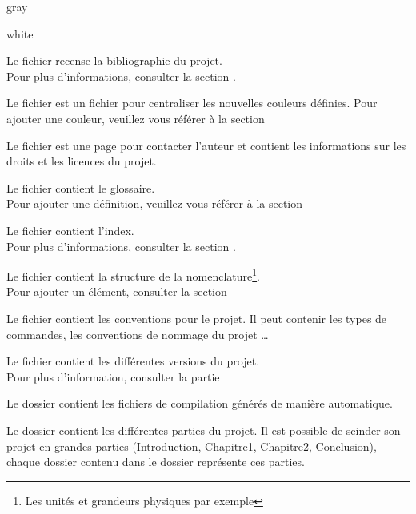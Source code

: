 {\begin{items}{gray}{\faFolder}
\begin{items}{white}{}
        \item Le fichier  recense la bibliographie du projet. \\Pour plus d'informations, consulter la section .

        \item Le fichier  est un fichier pour centraliser les nouvelles couleurs définies.
        Pour ajouter une couleur, veuillez vous référer à la section 

        \item Le fichier  est une page pour contacter l'auteur et contient les informations sur les 
        droits et les licences du projet.

        \item Le fichier  contient le glossaire.\\ Pour ajouter une définition, 
        veuillez vous référer à la section 
        
        \item Le fichier  contient l'index. \\Pour plus d'informations, consulter la section .

        \item Le fichier  contient la structure de la nomenclature\footnote{Les unités et 
        grandeurs physiques par exemple}.\\
        Pour ajouter un élément, consulter la section 

        \item Le fichier  contient les conventions pour le projet. Il peut contenir les types de commandes, 
        les conventions de nommage du projet \ldots

        \item Le fichier  contient les différentes versions du projet. \\ Pour plus d'information, 
        consulter la partie 

    \end{items}
    \item Le dossier  contient les fichiers de compilation générés de manière automatique. 

    \item Le dossier  contient les différentes parties du projet. Il est possible de scinder son projet 
    en grandes parties (Introduction, Chapitre1, Chapitre2, Conclusion), chaque dossier contenu dans le 
    dossier  représente ces parties.\\


\end{items}}
